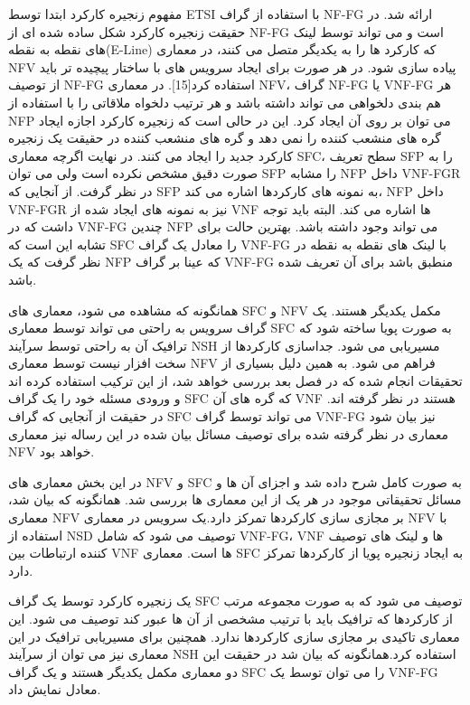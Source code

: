 \documentclass{book}
\begin{document}
مفهوم زنجیره کارکرد ابتدا توسط ETSI با استفاده از گراف NF-FG ارائه شد. در حقیقت زنجیره کارکرد شکل ساده شده ای از NF-FG است و می تواند توسط لینک های نقطه به نقطه(E-Line) که کارکرد ها را به یکدیگر متصل می کنند، در معماری NFV پیاده سازی شود. در هر صورت برای ایجاد سرویس های با ساختار پیچیده تر باید از توصیف NF-FG استفاده کرد[15]. در معماری NFV، گراف NF-FG یا VNF-FG هر هم بندی دلخواهی می تواند داشته باشد و هر ترتیب دلخواه ملاقاتی را با استفاده از NFP می توان بر روی آن ایجاد کرد. این در حالی است که زنجیره کارکرد اجازه ایجاد گره های منشعب کننده را نمی دهد و گره های منشعب کننده در حقیقت یک زنجیره کارکرد جدید را ایجاد می کنند. در نهایت اگرچه معماری SFC، سطح تعریف SFP را به صورت دقیق مشخص نکرده است ولی می توان SFP را مشابه NFP داخل VNF-FGR در نظر گرفت. از آنجایی که SFP به نمونه های کارکردها اشاره می کند، NFP داخل VNF-FGR نیز به نمونه های ایجاد شده از VNF ها اشاره می کند. البته باید توجه داشت که در VNF-FG چندین NFP می تواند وجود داشته باشد. بهترین حالت برای تشابه این است که SFC را معادل یک گراف VNF-FG با لینک های نقطه به نقطه در نظر گرفت که یک NFP که عینا بر گراف VNF-FG منطبق باشد برای آن تعریف شده باشد.

همانگونه که مشاهده می شود، معماری های SFC و NFV مکمل یکدیگر هستند. یک گراف سرویس به راحتی می تواند توسط معماری SFC به صورت پویا ساخته شود که ترافیک آن به راحتی توسط سرآیند NSH مسیریابی می شود. جداسازی کارکردها از سخت افزار نیست توسط معماری NFV فراهم می شود. به همین دلیل بسیاری از تحقیقات انجام شده که در فصل بعد بررسی خواهد شد، از این ترکیب استفاده کرده اند و ورودی مسئله خود را یک گراف SFC که گره های آن VNF هستند در نظر گرفته اند. در حقیقت از آنجایی که گراف SFC می تواند توسط گراف VNF-FG نیز بیان شود معماری در نظر گرفته شده برای توصیف مسائل بیان شده در این رساله نیز معماری NFV خواهد بود.


در این بخش معماری های NFV و SFC به صورت کامل شرح داده شد و اجزای آن ها و مسائل تحقیقاتی موجود در هر یک  از این معماری ها بررسی شد. همانگونه که بیان شد، معماری NFV بر مجازی سازی کارکردها تمرکز دارد.یک سرویس در معماری NFV با استفاده از NSD توصیف می شود که شامل VNF-FG، VNF ها و لینک های توصیف کننده ارتباطات بین VNF ها است. معماری SFC به ایجاد زنجیره پویا از کارکردها تمرکز دارد.

یک زنجیره کارکرد توسط یک گراف SFC توصیف می شود که به صورت مجموعه مرتب از کارکردها که ترافیک باید با ترتیب مشخصی از آن ها عبور کند توصیف می شود. این معماری تاکیدی بر مجازی سازی کارکردها ندارد. همچنین برای مسیریابی ترافیک در این معماری نیز می توان از سرآیند NSH استفاده کرد.همانگونه که بیان شد در حقیقت این دو معماری مکمل یکدیگر هستند و یک گراف SFC را می توان توسط یک VNF-FG معادل نمایش داد.
\end{document}
